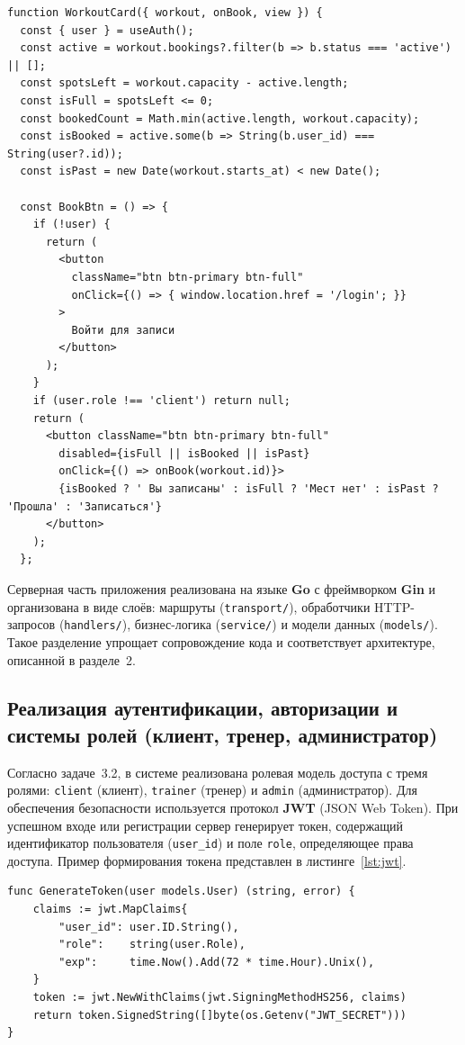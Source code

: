 \begin{lstlisting}[caption={Фрагмент компонента карточки тренировки (Schedule.js, стр.~8--41)}, label={lst:workout_card}]
function WorkoutCard({ workout, onBook, view }) {
  const { user } = useAuth();
  const active = workout.bookings?.filter(b => b.status === 'active') || [];
  const spotsLeft = workout.capacity - active.length;
  const isFull = spotsLeft <= 0;
  const bookedCount = Math.min(active.length, workout.capacity);
  const isBooked = active.some(b => String(b.user_id) === String(user?.id));
  const isPast = new Date(workout.starts_at) < new Date();

  const BookBtn = () => {
    if (!user) {
      return (
        <button
          className="btn btn-primary btn-full"
          onClick={() => { window.location.href = '/login'; }}
        >
          Войти для записи
        </button>
      );
    }
    if (user.role !== 'client') return null;
    return (
      <button className="btn btn-primary btn-full"
        disabled={isFull || isBooked || isPast}
        onClick={() => onBook(workout.id)}>
        {isBooked ? ' Вы записаны' : isFull ? 'Мест нет' : isPast ? 'Прошла' : 'Записаться'}
      </button>
    );
  };
\end{lstlisting}

Серверная часть приложения реализована на языке \textbf{Go} с фреймворком
\textbf{Gin} и организована в виде слоёв: маршруты (\texttt{transport/}),
обработчики HTTP-запросов (\texttt{handlers/}), бизнес-логика (\texttt{service/})
и модели данных (\texttt{models/}). Такое разделение упрощает сопровождение
кода и соответствует архитектуре, описанной в разделе~2.

\subsection{Реализация аутентификации, авторизации и системы ролей (клиент, тренер, администратор)}

Согласно задаче~3.2, в системе реализована ролевая модель доступа с тремя
ролями: \texttt{client} (клиент), \texttt{trainer} (тренер) и \texttt{admin}
(администратор). Для обеспечения безопасности используется протокол
\textbf{JWT} (JSON Web Token). При успешном входе или регистрации сервер
генерирует токен, содержащий идентификатор пользователя (\texttt{user\_id}) и
поле \texttt{role}, определяющее права доступа. Пример формирования токена
представлен в листинге~\ref{lst:jwt}.

\begin{lstlisting}[caption={Генерация JWT-токена при аутентификации (jwtutil.go, стр.~11--18)}, label={lst:jwt}]
func GenerateToken(user models.User) (string, error) {
	claims := jwt.MapClaims{
		"user_id": user.ID.String(),
		"role":    string(user.Role),
		"exp":     time.Now().Add(72 * time.Hour).Unix(),
	}
	token := jwt.NewWithClaims(jwt.SigningMethodHS256, claims)
	return token.SignedString([]byte(os.Getenv("JWT_SECRET")))
}
\end{lstlisting}

